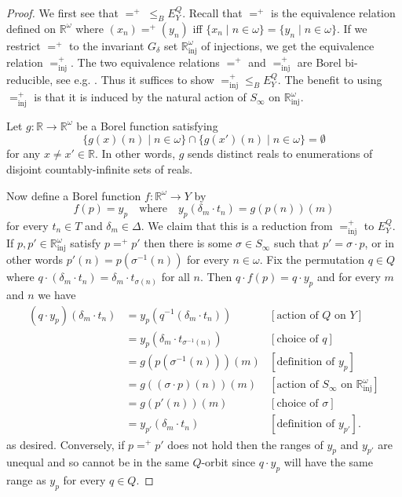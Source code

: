 \documentclass[12pt]{amsart}
\theoremstyle{plain}
\theoremstyle{definition}
\newcommand{\inj}{\text{inj}}
\begin{document}
\begin{proof}
We first see that $=^+ \; \le_B E^Q_Y$.
Recall that $=^+$ is the equivalence relation defined on $\mathbb{R}^\omega$ where $(x_n) =^+ (y_n)$ iff $\{x_n \mid n \in \omega\} = \{y_n \mid n \in \omega\}$.
If we restrict $=^+$ to the invariant $G_\delta$ set $\mathbb{R}^\omega_{\inj}$ of injections, we get the equivalence relation $=^+_\inj$.
The two equivalence relations $=^+$ and $=^+_\inj$ are Borel bi-reducible, see e.g. \cite[10.3.4]{Gao2008}.
Thus it suffices to show $=^+_\inj \le_B E^Q_Y$.
The benefit to using $=^+_\inj$ is that it is induced by the natural action of $S_\infty$ on $\mathbb{R}^\omega_\inj$.

Let $g : \mathbb{R} \rightarrow \mathbb{R}^\omega$ be a Borel function satisfying 
\[\{g(x)(n) \mid n \in \omega\} \cap \{g(x')(n) \mid n \in \omega\} = \emptyset\]
for any $x \neq x' \in \mathbb{R}$.
In other words, $g$ sends distinct reals to enumerations of disjoint countably-infinite sets of reals.

Now define a Borel function $f : \mathbb{R}^\omega \rightarrow Y$ by
\[ f(p) = y_p \quad \text{where} \quad y_p(\delta_m \cdot t_n) = g(p(n))(m)\]
for every $t_n \in T$ and $\delta_m \in \Delta$.
We claim that this is a reduction from $=^+_\inj$ to $E^Q_Y$.
If $p, p' \in \mathbb{R}^\omega_\inj$ satisfy $p =^+ p'$ then there is some $\sigma \in S_\infty$ such that $p' = \sigma \cdot p$, or in other words $p'(n) = p(\sigma^{-1}(n))$ for every $n \in \omega$.
Fix the permutation $q \in Q$ where $q \cdot (\delta_m \cdot t_n) = \delta_m \cdot t_{\sigma(n)}$ for all $n$.
Then $q \cdot f(p) = q \cdot y_p$ and for every $m$ and $n$ we have
\begin{align*}
(q \cdot y_p)(\delta_m \cdot t_n) &= y_p(q^{-1}(\delta_m \cdot t_n)) & [\text{action of } Q \text{ on } Y]\\
&= y_p(\delta_m \cdot t_{\sigma^{-1}(n)}) & [\text{choice of } q]\\
&= g(p(\sigma^{-1}(n)))(m) & [\text{definition of } y_p]\\
&= g((\sigma \cdot p)(n))(m) & [\text{action of } S_\infty \text{ on } \mathbb{R}^\omega_\inj]\\
&= g(p'(n))(m) & [\text{choice of } \sigma]\\
&= y_{p'}(\delta_m \cdot t_n) & [\text{definition of } y_{p'}].
\end{align*}
as desired.
Conversely, if $p =^+ p'$ does not hold then the ranges of $y_p$ and $y_{p'}$ are unequal and so cannot be in the same $Q$-orbit since $q \cdot y_p$ will have the same range as $y_p$ for every $q \in Q$.


\end{proof}
\end{document}

